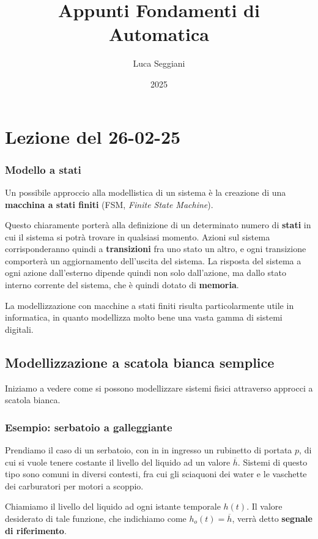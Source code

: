 \documentclass[a4paper,11pt]{article}
\title{Appunti Fondamenti di Automatica}
\author{Luca Seggiani}
\date{2025}
\begin{document}
\section{Lezione del 26-02-25}

\thispagestyle{empty}
\pagestyle{fancy}

\subsubsection{Modello a stati}
Un possibile approccio alla modellistica di un sistema è la creazione di una \textbf{macchina a stati finiti} (FSM, \textit{Finite State Machine}).

Questo chiaramente porterà alla definizione di un determinato numero di \textbf{stati} in cui il sistema si potrà trovare in qualsiasi momento.
Azioni sul sistema corrisponderanno quindi a \textbf{transizioni} fra uno stato un altro, e ogni transizione comporterà un aggiornamento dell'uscita del sistema.
La risposta del sistema a ogni azione dall'esterno dipende quindi non solo dall'azione, ma dallo stato interno corrente del sistema, che è quindi dotato di \textbf{memoria}.

La modellizzazione con macchine a stati finiti risulta particolarmente utile in informatica, in quanto modellizza molto bene una vasta gamma di sistemi digitali.

\subsection{Modellizzazione a scatola bianca semplice}
Iniziamo a vedere come si possono modellizzare sistemi fisici attraverso approcci a scatola bianca. 

\subsubsection{Esempio: serbatoio a galleggiante}
Prendiamo il caso di un serbatoio, con in in ingresso un rubinetto di portata $p$, di cui si vuole tenere costante il livello del liquido ad un valore $\overline{h}$. 
Sistemi di questo tipo sono comuni in diversi contesti, fra cui gli sciaquoni dei water e le vaschette dei carburatori per motori a scoppio.

Chiamiamo il livello del liquido ad ogni istante temporale $h(t)$.
Il valore desiderato di tale funzione, che indichiamo come $h_o(t) = \overline{h}$, verrà detto \textbf{segnale di riferimento}.
\end{document}
